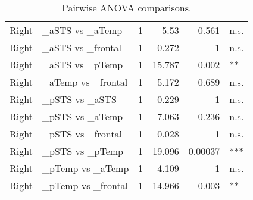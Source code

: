 \begin{table}[h]
\begin{tabular}{llrrrl}
 Right        & \_aSTS vs \_aTemp    &    1 &    5.53  &   0.561   & n.s.   \\
 Right        & \_aSTS vs \_frontal  &    1 &    0.272 &   1       & n.s.   \\
 Right        & \_aSTS vs \_pTemp    &    1 &   15.787 &   0.002   & **     \\
 Right        & \_aTemp vs \_frontal &    1 &    5.172 &   0.689   & n.s.   \\
 Right        & \_pSTS vs \_aSTS     &    1 &    0.229 &   1       & n.s.   \\
 Right        & \_pSTS vs \_aTemp    &    1 &    7.063 &   0.236   & n.s.   \\
 Right        & \_pSTS vs \_frontal  &    1 &    0.028 &   1       & n.s.   \\
 Right        & \_pSTS vs \_pTemp    &    1 &   19.096 &   0.00037 & ***    \\
 Right        & \_pTemp vs \_aTemp   &    1 &    4.109 &   1       & n.s.   \\
 Right        & \_pTemp vs \_frontal &    1 &   14.966 &   0.003   & **     \\
\bottomrule
\end{tabular}
\caption{Pairwise ANOVA comparisons.}
\end{table}